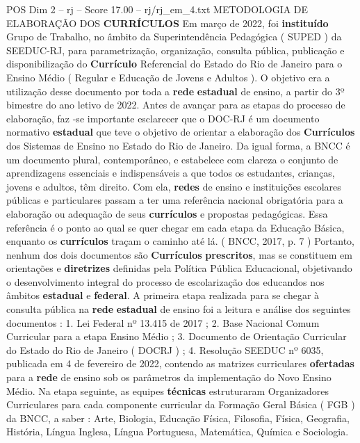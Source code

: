 \begin{textsample}{POS Dim 2 – rj – Score 17.00 – rj/rj\_em\_4.txt}  \label{ex:f2_pos_235}
METODOLOGIA DE ELABORAÇÃO DOS \textbf{CURRÍCULOS} Em março de 2022, foi \textbf{instituído} Grupo de Trabalho, no âmbito da Superintendência Pedagógica ( SUPED ) da SEEDUC-RJ, para parametrização, organização, consulta pública, publicação e disponibilização do \textbf{Currículo} Referencial do Estado do Rio de Janeiro para o Ensino Médio ( Regular e Educação de Jovens e Adultos ).
O objetivo era a utilização desse documento por toda a \textbf{rede} \textbf{estadual} de ensino, a partir do 3º bimestre do ano letivo de 2022.
Antes de avançar para as etapas do processo de elaboração, faz -se importante esclarecer que o DOC-RJ é um documento normativo \textbf{estadual} que teve o objetivo de orientar a elaboração dos \textbf{Currículos} dos Sistemas de Ensino no Estado do Rio de Janeiro.
Da igual forma, a BNCC é um documento plural, contemporâneo, e estabelece com clareza o conjunto de aprendizagens essenciais e indispensáveis a que todos os estudantes, crianças, jovens e adultos, têm direito.
Com ela, \textbf{redes} de ensino e instituições escolares públicas e particulares passam a ter uma referência nacional obrigatória para a elaboração ou adequação de seus \textbf{currículos} e propostas pedagógicas.
Essa referência é o ponto ao qual se quer chegar em cada etapa da Educação Básica, enquanto os \textbf{currículos} traçam o caminho até lá. ( BNCC, 2017, p. 7 ) Portanto, nenhum dos dois documentos são \textbf{Currículos} \textbf{prescritos}, mas se constituem em orientações e \textbf{diretrizes} definidas pela Política Pública Educacional, objetivando o desenvolvimento integral do processo de escolarização dos educandos nos âmbitos \textbf{estadual} e \textbf{federal}.
A primeira etapa realizada para se chegar à consulta pública na \textbf{rede} \textbf{estadual} de ensino foi a leitura e análise dos seguintes documentos : 1.
Lei Federal nº 13.415 de 2017 ; 2.
Base Nacional Comum Curricular para a etapa Ensino Médio ; 3.
Documento de Orientação Curricular do Estado do Rio de Janeiro ( DOCRJ ) ; 4.
Resolução SEEDUC nº 6035, publicada em 4 de fevereiro de 2022, contendo as matrizes curriculares \textbf{ofertadas} para a \textbf{rede} de ensino sob os parâmetros da implementação do Novo Ensino Médio.
Na etapa seguinte, as equipes \textbf{técnicas} estruturaram Organizadores Curriculares para cada componente curricular da Formação Geral Básica ( FGB ) da BNCC, a saber : Arte, Biologia, Educação Física, Filosofia, Física, Geografia, História, Língua Inglesa, Língua Portuguesa, Matemática, Química e Sociologia.

\end{textsample}
